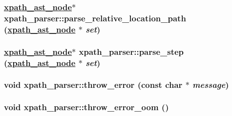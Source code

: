 \hypertarget{structxpath__parser_b50d8b75f78b7e2eb77a1cf6872daa00}{
\subsubsection[parse\_\-relative\_\-location\_\-path]{\setlength{\rightskip}{0pt plus 5cm}\hyperlink{classxpath__ast__node}{xpath\_\-ast\_\-node}$\ast$ xpath\_\-parser::parse\_\-relative\_\-location\_\-path (\hyperlink{classxpath__ast__node}{xpath\_\-ast\_\-node} $\ast$ {\em set})}}
\label{structxpath__parser_b50d8b75f78b7e2eb77a1cf6872daa00}


\hypertarget{structxpath__parser_7daf146822e199d8ad564be25daa49db}{
\subsubsection[parse\_\-step]{\setlength{\rightskip}{0pt plus 5cm}\hyperlink{classxpath__ast__node}{xpath\_\-ast\_\-node}$\ast$ xpath\_\-parser::parse\_\-step (\hyperlink{classxpath__ast__node}{xpath\_\-ast\_\-node} $\ast$ {\em set})}}
\label{structxpath__parser_7daf146822e199d8ad564be25daa49db}


\hypertarget{structxpath__parser_043353db574741cd4f460a042a0b22c6}{
\subsubsection[throw\_\-error]{\setlength{\rightskip}{0pt plus 5cm}void xpath\_\-parser::throw\_\-error (const char $\ast$ {\em message})}}
\label{structxpath__parser_043353db574741cd4f460a042a0b22c6}


\hypertarget{structxpath__parser_eb5c7d7a6f8c5705a769297f42960c3e}{
\subsubsection[throw\_\-error\_\-oom]{\setlength{\rightskip}{0pt plus 5cm}void xpath\_\-parser::throw\_\-error\_\-oom ()}}
\label{structxpath__parser_eb5c7d7a6f8c5705a769297f42960c3e}




